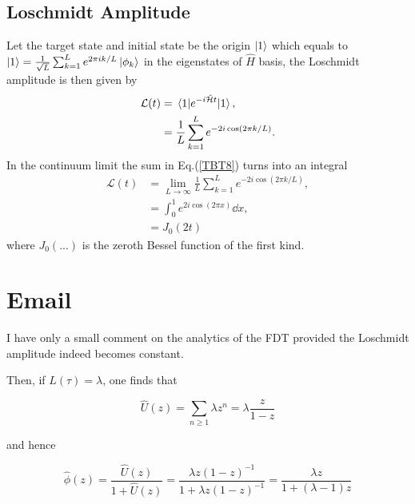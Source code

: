 \documentclass{article}
\numberwithin{equation}{section}
\renewcommand{\H}{\mathcal{\hat{H}}} %
\newcommand{\1}{\mathbb{1}}
\begin{document}
\subsection{Loschmidt Amplitude}
Let the target state and initial state be the origin $\ket{1}$ which equals to $\ket{1}=\frac{1}{\sqrt{L}}\sum_{k=1}^{L}e^{2\pi i k/L}\ket{\phi_k}$ in the eigenstates of $\hat{H}$ basis, the Loschmidt amplitude is then given by 
\begin{align}
    \mathcal{L}(t)&=\expval{e^{-i \H t}}{1},
    \\
    &=\frac{1}{L}\sum_{k=1}^{L}e^{-2i\cos(2\pi k/L)}. \label{TBT8}
\end{align}
In the continuum limit the sum in Eq.(\ref{TBT8}) turns into an integral
\begin{align}
    \mathcal{L}(t)&=\lim_{L\to\infty}\frac{1}{L}\sum_{k=1}^{L}e^{-2i\cos(2\pi k/L)},
    \\
    &=\int_0^1 e^{2i\cos(2\pi x)} \dd x,
    \\
    &=J_0(2t)
\end{align}
where $J_0(...)$ is the zeroth Bessel function of the first kind.






































\section{Email}
I have only a small comment on the analytics of the FDT provided the Loschmidt amplitude indeed becomes constant.

Then, if $L(\tau) = \lambda$, one finds that

$$\hat{U}(z) = \sum_{n \geq 1} \lambda z^n = \lambda \frac{z}{1-z}$$

and hence

$$\hat{\phi}(z) = \frac{\hat{U}(z)}{1 + \hat{U}(z)} = \frac{\lambda z (1-z)^{-1}}{ 1 + \lambda z (1-z)^{-1} } = \frac{\lambda z }{1 + (\lambda - 1) z}$$
\end{document}
